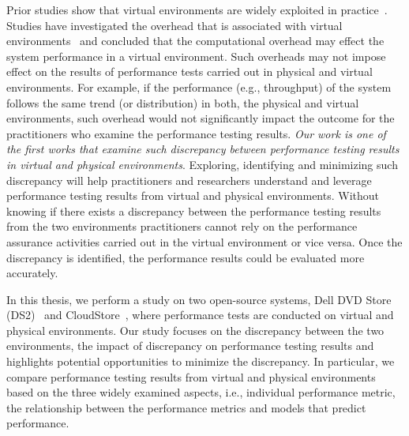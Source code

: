 \begin{sloppypar}
Prior studies show that virtual environments are widely exploited in practice~\cite{Cito:2015:MCA:2786805.2786826,Nguyen:2012:ADP:2188286.2188344,xiong2013vperfguard}. Studies have investigated the overhead that is associated with virtual environments~\cite{menon2005diagnosing} and concluded that the computational overhead may effect the system performance in a virtual environment. Such overheads may not impose effect on the results of performance tests carried out in physical and virtual environments. For example, if the performance (e.g., throughput) of the system follows the same trend (or distribution) in both, the physical and virtual environments, such overhead would not significantly impact the outcome for the practitioners who examine the performance testing results. \textit{Our work is one of the first works that examine such discrepancy between performance testing results in virtual and physical environments}. Exploring, identifying and minimizing such discrepancy will help practitioners and researchers understand and leverage performance testing results from virtual and physical environments. Without knowing if there exists a discrepancy between the performance testing results from the two environments practitioners cannot rely on the performance assurance activities carried out in the virtual environment or vice versa. Once the discrepancy is identified, the performance results could be evaluated more accurately.
\end{sloppypar}

In this thesis, we perform a study on two open-source systems, Dell DVD Store (DS2)~\cite{delldvd} and CloudStore~\cite{cloudstore}, where performance tests are conducted on virtual and physical environments. Our study focuses on the discrepancy between the two environments, the impact of discrepancy on performance testing results and highlights potential opportunities to minimize the discrepancy. In particular, we compare performance testing results from virtual and physical environments based on the three widely examined aspects, i.e., individual performance metric, the relationship between the performance metrics and models that predict performance. 

